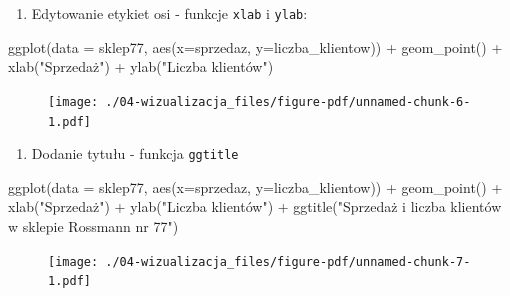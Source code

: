 \documentclass[
  letterpaper,
  DIV=11,
  numbers=noendperiod]{scrreprt}
\newenvironment{Shaded}{\begin{snugshade}}{\end{snugshade}}
\newcommand{\AttributeTok}[1]{\textcolor[rgb]{0.40,0.45,0.13}{#1}}
\newcommand{\FunctionTok}[1]{\textcolor[rgb]{0.28,0.35,0.67}{#1}}
\newcommand{\NormalTok}[1]{\textcolor[rgb]{0.00,0.23,0.31}{#1}}
\newcommand{\SpecialCharTok}[1]{\textcolor[rgb]{0.37,0.37,0.37}{#1}}
\newcommand{\StringTok}[1]{\textcolor[rgb]{0.13,0.47,0.30}{#1}}
\providecommand{\tightlist}{%
  \setlength{\itemsep}{0pt}\setlength{\parskip}{0pt}}\usepackage{longtable,booktabs,array}
\begin{document}
\begin{enumerate}
\def\labelenumi{\arabic{enumi}.}
\setcounter{enumi}{2}
\tightlist
\item
  Edytowanie etykiet osi - funkcje \texttt{xlab} i \texttt{ylab}:
\end{enumerate}

\begin{Shaded}
\begin{Highlighting}[]
\FunctionTok{ggplot}\NormalTok{(}\AttributeTok{data =}\NormalTok{ sklep77, }\FunctionTok{aes}\NormalTok{(}\AttributeTok{x=}\NormalTok{sprzedaz, }\AttributeTok{y=}\NormalTok{liczba\_klientow)) }\SpecialCharTok{+}
  \FunctionTok{geom\_point}\NormalTok{() }\SpecialCharTok{+}
  \FunctionTok{xlab}\NormalTok{(}\StringTok{"Sprzedaż"}\NormalTok{) }\SpecialCharTok{+}
  \FunctionTok{ylab}\NormalTok{(}\StringTok{"Liczba klientów"}\NormalTok{)}
\end{Highlighting}
\end{Shaded}

\begin{figure}[H]

{\centering \texttt{[image: ./04-wizualizacja\_files/figure-pdf/unnamed-chunk-6-1.pdf]}

}

\end{figure}

\begin{enumerate}
\def\labelenumi{\arabic{enumi}.}
\setcounter{enumi}{3}
\tightlist
\item
  Dodanie tytułu - funkcja \texttt{ggtitle}
\end{enumerate}

\begin{Shaded}
\begin{Highlighting}[]
\FunctionTok{ggplot}\NormalTok{(}\AttributeTok{data =}\NormalTok{ sklep77, }\FunctionTok{aes}\NormalTok{(}\AttributeTok{x=}\NormalTok{sprzedaz, }\AttributeTok{y=}\NormalTok{liczba\_klientow)) }\SpecialCharTok{+}
  \FunctionTok{geom\_point}\NormalTok{() }\SpecialCharTok{+}
  \FunctionTok{xlab}\NormalTok{(}\StringTok{"Sprzedaż"}\NormalTok{) }\SpecialCharTok{+}
  \FunctionTok{ylab}\NormalTok{(}\StringTok{"Liczba klientów"}\NormalTok{) }\SpecialCharTok{+}
  \FunctionTok{ggtitle}\NormalTok{(}\StringTok{"Sprzedaż i liczba klientów w sklepie Rossmann nr 77"}\NormalTok{)}
\end{Highlighting}
\end{Shaded}

\begin{figure}[H]

{\centering \texttt{[image: ./04-wizualizacja\_files/figure-pdf/unnamed-chunk-7-1.pdf]}

}

\end{figure}
\end{document}
